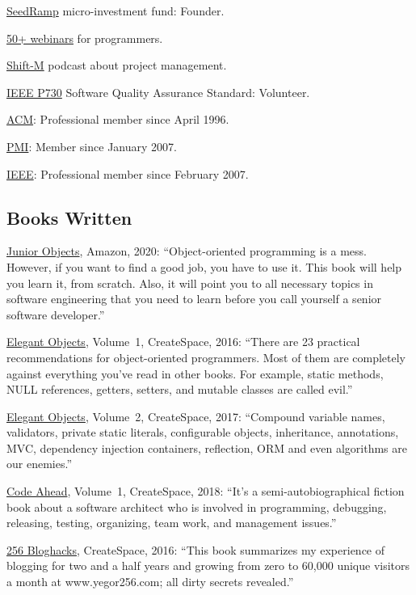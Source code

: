\documentclass{yb}
\begin{document}
\href{https:www.seedramp.com/}{SeedRamp} micro-investment fund: Founder.

\href{https://www.yegor256.com/webinars.html}{50+ webinars} for programmers.

\href{https://www.yegor256.com/shift-m.html}{Shift-M} podcast about project management.

\href{http://ieeexplore.ieee.org/document/6835311/}{IEEE P730} Software Quality Assurance Standard: Volunteer.

\href{https://www.acm.org}{ACM}: Professional member since April 1996.

\href{https://certification.pmi.org/registry.aspx}{PMI}: Member since January 2007.

\href{https://www.ieee.org}{IEEE}: Professional member since February 2007.

\subsection*{Books Written}

\href{https://amzn.to/2u9BbqF}{Junior Objects}, Amazon, 2020:
``Object-oriented programming is a mess. However,
if you want to find a good job, you have to use it.
This book will help you learn it, from scratch.
Also, it will point you to all necessary topics
in software engineering that you need to learn before
you call yourself a senior software developer.''

\href{https://amzn.to/2E5UHqZ}{Elegant Objects}, Volume~1, CreateSpace, 2016:
``There are 23 practical recommendations for object-oriented programmers. Most of them are completely
against everything you've read in other books.
For example, static methods, NULL references, getters, setters, and
mutable classes are called evil.''

\href{https://amzn.to/2J2s5T4}{Elegant Objects}, Volume~2, CreateSpace, 2017:
``Compound variable names, validators, private static literals, configurable objects, inheritance,
annotations, MVC, dependency injection containers, reflection, ORM and even algorithms are our enemies.''

\href{https://amzn.to/2u9BbqF}{Code Ahead}, Volume~1, CreateSpace, 2018:
``It's a semi-autobiographical fiction book about a software architect
who is involved in programming, debugging, releasing, testing,
organizing, team work, and management issues.''

\href{https://amzn.to/2GkuyXf}{256 Bloghacks}, CreateSpace, 2016:
``This book summarizes my experience of blogging for two and a half years and growing from zero to 60,000
unique visitors a month at www.yegor256.com; all dirty secrets revealed.''
\end{document}
